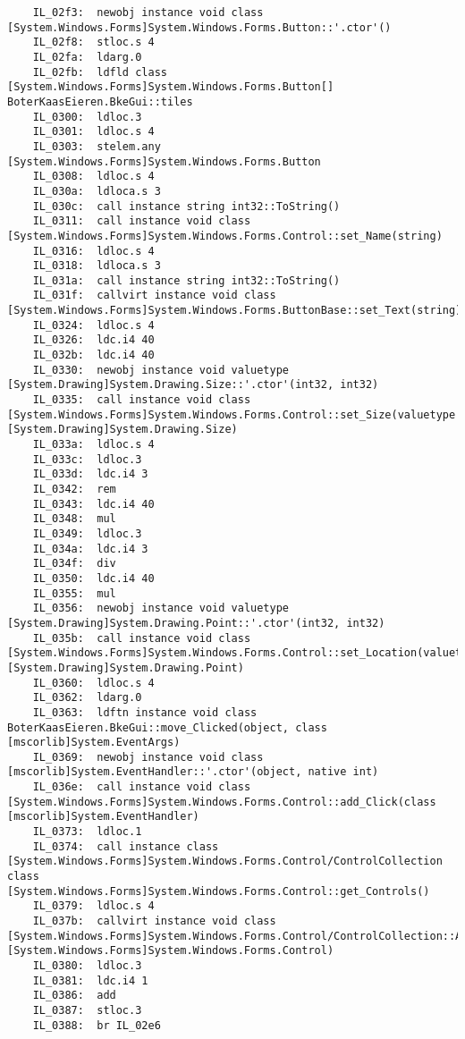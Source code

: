 \begin{lstlisting}
	IL_02f3:  newobj instance void class [System.Windows.Forms]System.Windows.Forms.Button::'.ctor'()
	IL_02f8:  stloc.s 4
	IL_02fa:  ldarg.0 
	IL_02fb:  ldfld class [System.Windows.Forms]System.Windows.Forms.Button[] BoterKaasEieren.BkeGui::tiles
	IL_0300:  ldloc.3 
	IL_0301:  ldloc.s 4
	IL_0303:  stelem.any [System.Windows.Forms]System.Windows.Forms.Button
	IL_0308:  ldloc.s 4
	IL_030a:  ldloca.s 3
	IL_030c:  call instance string int32::ToString()
	IL_0311:  call instance void class [System.Windows.Forms]System.Windows.Forms.Control::set_Name(string)
	IL_0316:  ldloc.s 4
	IL_0318:  ldloca.s 3
	IL_031a:  call instance string int32::ToString()
	IL_031f:  callvirt instance void class [System.Windows.Forms]System.Windows.Forms.ButtonBase::set_Text(string)
	IL_0324:  ldloc.s 4
	IL_0326:  ldc.i4 40
	IL_032b:  ldc.i4 40
	IL_0330:  newobj instance void valuetype [System.Drawing]System.Drawing.Size::'.ctor'(int32, int32)
	IL_0335:  call instance void class [System.Windows.Forms]System.Windows.Forms.Control::set_Size(valuetype [System.Drawing]System.Drawing.Size)
	IL_033a:  ldloc.s 4
	IL_033c:  ldloc.3 
	IL_033d:  ldc.i4 3
	IL_0342:  rem 
	IL_0343:  ldc.i4 40
	IL_0348:  mul 
	IL_0349:  ldloc.3 
	IL_034a:  ldc.i4 3
	IL_034f:  div 
	IL_0350:  ldc.i4 40
	IL_0355:  mul 
	IL_0356:  newobj instance void valuetype [System.Drawing]System.Drawing.Point::'.ctor'(int32, int32)
	IL_035b:  call instance void class [System.Windows.Forms]System.Windows.Forms.Control::set_Location(valuetype [System.Drawing]System.Drawing.Point)
	IL_0360:  ldloc.s 4
	IL_0362:  ldarg.0 
	IL_0363:  ldftn instance void class BoterKaasEieren.BkeGui::move_Clicked(object, class [mscorlib]System.EventArgs)
	IL_0369:  newobj instance void class [mscorlib]System.EventHandler::'.ctor'(object, native int)
	IL_036e:  call instance void class [System.Windows.Forms]System.Windows.Forms.Control::add_Click(class [mscorlib]System.EventHandler)
	IL_0373:  ldloc.1 
	IL_0374:  call instance class [System.Windows.Forms]System.Windows.Forms.Control/ControlCollection class [System.Windows.Forms]System.Windows.Forms.Control::get_Controls()
	IL_0379:  ldloc.s 4
	IL_037b:  callvirt instance void class [System.Windows.Forms]System.Windows.Forms.Control/ControlCollection::Add(class [System.Windows.Forms]System.Windows.Forms.Control)
	IL_0380:  ldloc.3 
	IL_0381:  ldc.i4 1
	IL_0386:  add 
	IL_0387:  stloc.3 
	IL_0388:  br IL_02e6


\end{lstlisting}
